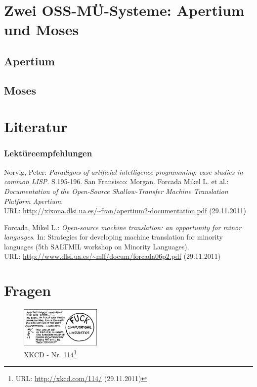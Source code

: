 \documentclass{clsemhs11-beamer}
\begin{document}
\section{Zwei OSS-MÜ-Systeme: Apertium und Moses}
\subsection{Apertium}
\subsection{Moses}
\section{Literatur}
\begin{frame}
  \frametitle{Lektüreempfehlungen}

\begin{thebibliography}{...............}
Norvig, Peter: \emph{Paradigms of artificial intelligence programming: case studies in common LISP}. S.195-196. San Fransisco: Morgan.
Forcada Mikel L. et al.: \emph{Documentation of the Open-Source Shallow-Transfer Machine Translation Platform Apertium}.\\
URL: \url{http://xixona.dlsi.ua.es/~fran/apertium2-documentation.pdf} (29.11.2011)

Forcada, Mikel L.: \emph{Open-source machine translation: an opportunity for minor languages}. In: Strategies for developing machine translation for minority languages (5th SALTMIL workshop on Minority Languages).\\URL: \url{http://www.dlsi.ua.es/~mlf/docum/forcada06p2.pdf} (29.11.2011)
\end{thebibliography}

\end{frame}
\section{Fragen}
\begin{frame}
  \begin{figure}
  \includegraphics[width=0.35\textwidth]{graphics/xkcd--cl}
  \caption{XKCD - Nr. 114\footnote{URL: \url{http://xkcd.com/114/} (29.11.2011)}}
  \end{figure}
\end{frame}
\end{document}
